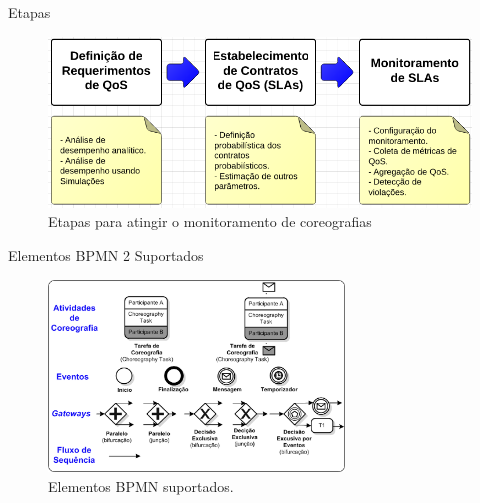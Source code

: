 \documentclass[xcolor=svgnames]{beamer}
\begin{document}
  \begin{frame}{Etapas}

    \begin{figure}
	\centering
	\includegraphics[width=1.0\textwidth]{MonitoringStages.png}
	\caption{Etapas para atingir o monitoramento de coreografias}
    \end{figure}	

  \end{frame}

  \begin{frame}{Elementos BPMN 2 Suportados }
      \begin{figure}[!h]
	\centering
	\includegraphics[width=0.7\textwidth]{./figures/BPMNBasicChoroegraphy.png}
	\caption{Elementos BPMN suportados.}
	\label{fig:ChoreographyElements}
    \end{figure}

  \end{frame}
\end{document}
